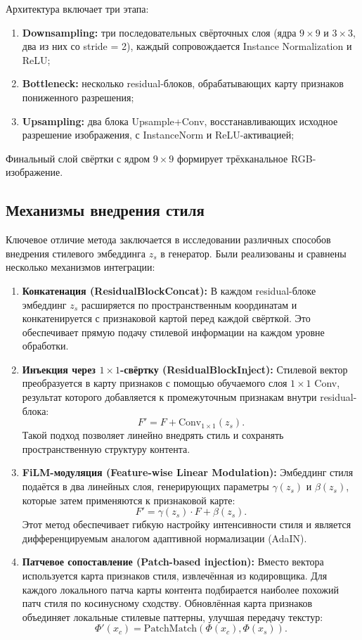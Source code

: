 \documentclass{article}
\begin{document}
Архитектура включает три этапа:
\begin{enumerate}
    \item \textbf{Downsampling:} три последовательных свёрточных слоя (ядра $9 \times 9$ и $3 \times 3$, два из них со stride = 2), каждый сопровождается Instance Normalization и ReLU;
    \item \textbf{Bottleneck:} несколько residual-блоков, обрабатывающих карту признаков пониженного разрешения;
    \item \textbf{Upsampling:} два блока Upsample+Conv, восстанавливающих исходное разрешение изображения, с InstanceNorm и ReLU-активацией;
\end{enumerate}
Финальный слой свёртки с ядром $9 \times 9$ формирует трёхканальное RGB-изображение.

\subsection*{Механизмы внедрения стиля}

Ключевое отличие метода заключается в исследовании различных способов внедрения стилевого эмбеддинга $z_s$ в генератор.  
Были реализованы и сравнены несколько механизмов интеграции:

\begin{enumerate}
    \item \textbf{Конкатенация (ResidualBlockConcat):}  
    В каждом residual-блоке эмбеддинг $z_s$ расширяется по пространственным координатам и конкатенируется с признаковой картой перед каждой свёрткой.  
    Это обеспечивает прямую подачу стилевой информации на каждом уровне обработки.

    \item \textbf{Инъекция через $1 \times 1$-свёртку (ResidualBlockInject):}  
    Стилевой вектор преобразуется в карту признаков с помощью обучаемого слоя $1 \times 1$ Conv, результат которого добавляется к промежуточным признакам внутри residual-блока:
    $$
    F' = F + \mathrm{Conv}_{1\times1}(z_s).
    $$
    Такой подход позволяет линейно внедрять стиль и сохранять пространственную структуру контента.

    \item \textbf{FiLM-модуляция (Feature-wise Linear Modulation):}  
    Эмбеддинг стиля подаётся в два линейных слоя, генерирующих параметры $\gamma(z_s)$ и $\beta(z_s)$, которые затем применяются к признаковой карте:
    $$
    F' = \gamma(z_s) \cdot F + \beta(z_s).
    $$
    Этот метод обеспечивает гибкую настройку интенсивности стиля и является дифференцируемым аналогом адаптивной нормализации (AdaIN).

    \item \textbf{Патчевое сопоставление (Patch-based injection):}  
    Вместо вектора используется карта признаков стиля, извлечённая из кодировщика.  
    Для каждого локального патча карты контента подбирается наиболее похожий патч стиля по косинусному сходству.  
    Обновлённая карта признаков объединяет локальные стилевые паттерны, улучшая передачу текстур:
    $$
    \Phi'(x_c) = \mathrm{PatchMatch}(\Phi(x_c), \Phi(x_s)).
    $$
\end{enumerate}
\end{document}
